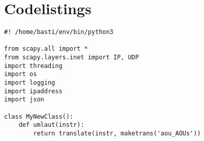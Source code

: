 
\chapter{Codelistings}

\vspace{6mm}
\begin{lstlisting}[caption=DNS Auflösung von cs.hm.edu, label=lst:labeldescodes]
#! /home/basti/env/bin/python3

from scapy.all import *
from scapy.layers.inet import IP, UDP
import threading
import os
import logging
import ipaddress
import json

class MyNewClass():
	def umlaut(instr):
		return translate(instr, maketrans('aou_AOUs'))
\end{lstlisting}